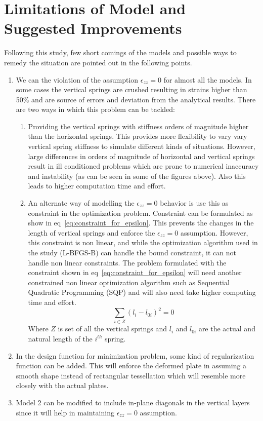 \section{Limitations of Model and Suggested Improvements}
\label{sec:Limitations}
Following this study, few short comings of the models and possible ways to remedy the situation are pointed out in the following points.
\begin{enumerate}
    \item We can the violation of the assumption $\epsilon_{zz} = 0$ for almost all the models. In some cases the vertical springs are crushed resulting in strains higher than 50\% and are source of errors and deviation from the analytical results. There are two ways in which this problem can be tackled:
    \begin{enumerate}
        \item Providing the vertical springs with stiffness orders of magnitude higher than the horizontal springs. This provides more flexibility to vary vary vertical spring stiffness to simulate different kinds of situations. However, large differences in orders of magnitude of horizontal and vertical springs result in ill conditioned problems which are prone to numerical inaccuracy and instability (as can be seen in some of the figures above). Also this leads to higher computation time and effort.
        \item An alternate way of modelling the $\epsilon_{zz} = 0$ behavior is use this as constraint in the optimization problem. Constraint can be formulated as show in eq~\ref{eq:constraint_for_epsilon}. This prevents the changes in the length of vertical springs and enforce the $\epsilon_{zz} = 0$ assumption. However, this constraint is non linear, and while the optimization algorithm used in the study (L-BFGS-B) can handle the bound constraint, it can not handle non linear constraints. The problem formulated with the constraint shown in eq~\ref{eq:constraint_for_epsilon} will need another constrained non linear optimization algorithm such as Sequential Quadratic Programming (SQP) and will also need take higher computing time and effort.
        \begin{equation}
            \sum_{i \in Z} (l_i - l_{0i})^2 = 0
            \label{eq:constraint_for_epsilon}
        \end{equation}
        Where $Z$ is set of all the vertical springs and $l_i$ and $l_{0i}$ are the actual and natural length of the $i^{th}$ spring.
    \end{enumerate}
    \item In the design function for minimization problem, some kind of regularization function can be added. This will enforce the deformed plate in assuming a smooth shape instead of rectangular tessellation which will resemble more closely with the actual plates.
    \item Model 2 can be modified to include in-plane diagonals in the vertical layers since it will help in maintaining $\epsilon_{zz} = 0$ assumption.
\end{enumerate}
